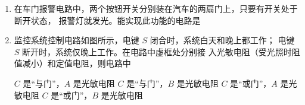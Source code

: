\begin{enumerate}
\item
{}
在车门报警电路中，两个按钮开关分别装在汽车的两扇门上，只要有开关处于断开状态，
报警灯就发光。能实现此功能的电路是  


\pfourchoices
{}
{}
{}
{}


\item 
{}
监控系统控制电路如图所示，电键 $ S $ 闭合时，系统白天和晚上都工作；
电键 $ S $ 断开时，系统仅晚上工作。在电路中虚框处分别接
入光敏电阻（受光照时阻值减小）和定值电阻，则电路中  
\begin{figure}[h!]
\centering

\end{figure}



\fourchoices
{$ C $ 是“与门”，$ A $ 是光敏电阻}
{$ C $ 是“与门”，$ B $ 是光敏电阻}
{$ C $ 是“或门”，$ A $ 是光敏电阻}
{$ C $ 是“或门”，$ B $ 是光敏电阻}




\end{enumerate}

